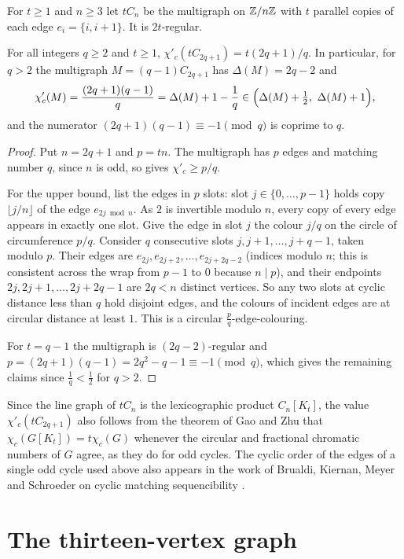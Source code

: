 \documentclass[11pt,colorlinks]{charlie}
\newcommand{\cind}{\chi'_c}
\begin{document}
For $t\ge1$ and $n\ge3$ let $tC_n$ be the multigraph on $\mathbb{Z}/n\mathbb{Z}$ with $t$ parallel copies of each edge $e_i=\{i,i+1\}$. It is $2t$-regular.

\begin{theorem}\label{thm:multi}
For all integers $q\ge2$ and $t\ge1$, $\cind(tC_{2q+1})=t(2q+1)/q$. In particular, for $q>2$ the multigraph $M=(q-1)C_{2q+1}$ has $\Delta(M)=2q-2$ and
\[
\cind(M)=\frac{(2q+1)(q-1)}{q}=\Delta(M)+1-\frac1q\in\Bigl(\Delta(M)+\tfrac12,\ \Delta(M)+1\Bigr),
\]
and the numerator $(2q+1)(q-1)\equiv-1\pmod q$ is coprime to $q$.
\end{theorem}

\begin{proof}
Put $n=2q+1$ and $p=tn$. The multigraph has $p$ edges and matching number $q$, since $n$ is odd, so  gives $\cind\ge p/q$.

For the upper bound, list the edges in $p$ slots: slot $j\in\{0,\dots,p-1\}$ holds copy $\lfloor j/n\rfloor$ of the edge $e_{2j\bmod n}$. As $2$ is invertible modulo $n$, every copy of every edge appears in exactly one slot. Give the edge in slot $j$ the colour $j/q$ on the circle of circumference $p/q$. Consider $q$ consecutive slots $j,j+1,\dots,j+q-1$, taken modulo $p$. Their edges are $e_{2j},e_{2j+2},\dots,e_{2j+2q-2}$ (indices modulo $n$; this is consistent across the wrap from $p-1$ to $0$ because $n\mid p$), and their endpoints $2j,2j+1,\dots,2j+2q-1$ are $2q<n$ distinct vertices. So any two slots at cyclic distance less than $q$ hold disjoint edges, and the colours of incident edges are at circular distance at least $1$. This is a circular $\frac pq$-edge-colouring.

For $t=q-1$ the multigraph is $(2q-2)$-regular and $p=(2q+1)(q-1)=2q^2-q-1\equiv-1\pmod q$, which gives the remaining claims since $\frac1q<\frac12$ for $q>2$.
\end{proof}

Since the line graph of $tC_n$ is the lexicographic product $C_n[K_t]$, the value $\cind(tC_{2q+1})$ also follows from the theorem of Gao and Zhu \cite{GZ} that $\chi_c(G[K_t])=t\chi_c(G)$ whenever the circular and fractional chromatic numbers of $G$ agree, as they do for odd cycles. The cyclic order of the edges of a single odd cycle used above also appears in the work of Brualdi, Kiernan, Meyer and Schroeder on cyclic matching sequencibility \cite{BKMS}.

\section{The thirteen-vertex graph}\label{sec:core}
\end{document}
